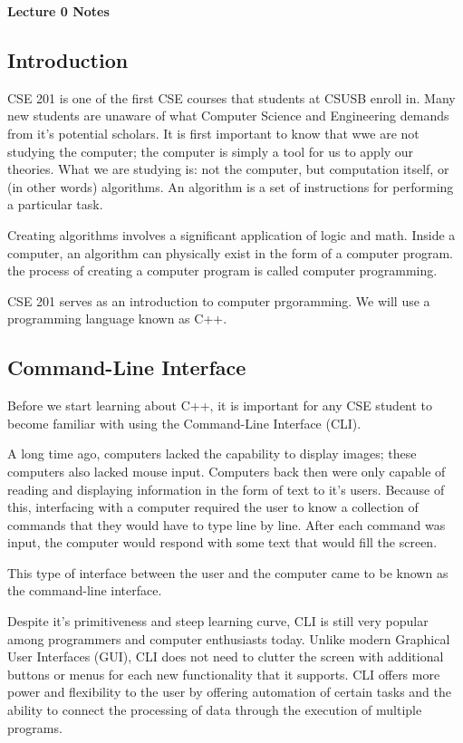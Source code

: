\documentclass[a4paper,12pt]{article}
\begin{document}
\lstset{basicstyle=\ttfamily,tabsize=4}

{\centering \bf \Large
Lecture 0 Notes \\
}

\subsection*{Introduction}

CSE 201 is one of the first CSE courses that students at CSUSB enroll in. Many new students are unaware of what Computer Science and Engineering demands from it's potential scholars. It is first important to know that wwe are not studying the computer; the computer is simply a tool for us to apply our theories. What we are studying is: not the computer, but computation itself, or (in other words) algorithms. An algorithm is a set of instructions for performing a particular task.

Creating algorithms involves a significant application of logic and math. Inside a computer, an algorithm can physically exist in the form of a computer program. the process of creating a computer program is called computer programming.

CSE 201 serves as an introduction to computer prgoramming. We will use a programming language known as C++. 

\subsection*{Command-Line Interface}

Before we start learning about C++, it is important for any CSE student to become familiar with using the Command-Line Interface (CLI). 

A long time ago, computers lacked the capability to display images; these computers also lacked mouse input. Computers back then were only capable of reading and displaying information in the form of text to it's users. Because of this, interfacing with a computer required the user to know a collection of commands that they would have to type line by line. After each command was input, the computer would respond with some text that would fill the screen. 

This type of interface between the user and the computer came to be known as the command-line interface.

Despite it's primitiveness and steep learning curve, CLI is still very popular among programmers and computer enthusiasts today. Unlike modern Graphical User Interfaces (GUI), CLI does not need to clutter the screen with additional buttons or menus for each new functionality that it supports. CLI offers more power and flexibility to the user by offering automation of certain tasks and the ability to connect the processing of data through the execution of multiple programs.
\end{document}
